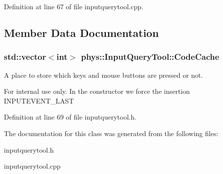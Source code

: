 Definition at line 67 of file inputquerytool.cpp.



\subsection{Member Data Documentation}
\hypertarget{classphys_1_1InputQueryTool_ae4ca82bd8afc87c2f07cef779449c60b}{
\subsubsection[{CodeCache}]{\setlength{\rightskip}{0pt plus 5cm}std::vector$<$int$>$ {\bf phys::InputQueryTool::CodeCache}}}
\label{da/d96/classphys_1_1InputQueryTool_ae4ca82bd8afc87c2f07cef779449c60b}


A place to store which keys and mouse buttons are pressed or not. 

\begin{DoxyInternal}{For internal use only.}
In the constructor we force the insertion INPUTEVENT\_\-LAST \end{DoxyInternal}


Definition at line 69 of file inputquerytool.h.



The documentation for this class was generated from the following files:\begin{DoxyCompactItemize}
\item 
inputquerytool.h\item 
inputquerytool.cpp\end{DoxyCompactItemize}
